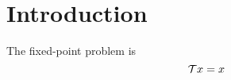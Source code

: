 \section{Introduction}
The fixed-point problem is
\begin{equation}\label{eqn:fix_point_set}
{\mathcal{T}} x = x
\end{equation}

